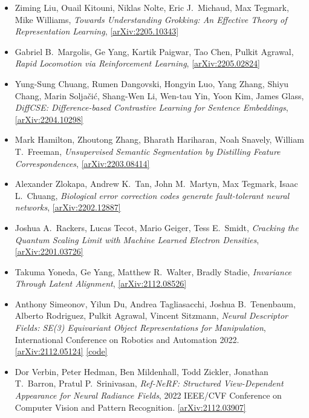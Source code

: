 \begin{itemize}
\item Ziming Liu, Ouail Kitouni, Niklas Nolte, Eric J.\  Michaud, Max Tegmark, Mike Williams, \textit{Towards Understanding Grokking: An Effective Theory of Representation Learning}, \href{https://arxiv.org/abs/2205.10343}{[arXiv:2205.10343]} 
\item Gabriel B.\  Margolis, Ge Yang, Kartik Paigwar, Tao Chen, Pulkit Agrawal, \textit{Rapid Locomotion via Reinforcement Learning}, \href{https://arxiv.org/abs/2205.02824}{[arXiv:2205.02824]} 
\item Yung-Sung Chuang, Rumen Dangovski, Hongyin Luo, Yang Zhang, Shiyu Chang, Marin Soljačić, Shang-Wen Li, Wen-tau Yin, Yoon Kim, James Glass, \textit{DiffCSE: Difference-based Contrastive Learning for Sentence Embeddings}, \href{https://arxiv.org/abs/2204.10298}{[arXiv:2204.10298]} 
\item Mark Hamilton, Zhoutong Zhang, Bharath Hariharan, Noah Snavely, William T.\  Freeman, \textit{Unsupervised Semantic Segmentation by Distilling Feature Correspondences}, \href{https://arxiv.org/abs/2203.08414}{[arXiv:2203.08414]} 
\item Alexander Zlokapa, Andrew K.\  Tan, John M.\  Martyn, Max Tegmark, Isaac L.\  Chuang, \textit{Biological error correction codes generate fault-tolerant neural networks}, \href{https://arxiv.org/abs/2202.12887}{[arXiv:2202.12887]} 
\item Joshua A.\  Rackers, Lucas Tecot, Mario Geiger, Tess E.\  Smidt, \textit{Cracking the Quantum Scaling Limit with Machine Learned Electron Densities}, \href{https://arxiv.org/abs/2201.03726}{[arXiv:2201.03726]} 
\item Takuma Yoneda, Ge Yang, Matthew R.\  Walter, Bradly Stadie, \textit{Invariance Through Latent Alignment}, \href{https://arxiv.org/abs/2112.08526}{[arXiv:2112.08526]} 
\item Anthony Simeonov, Yilun Du, Andrea Tagliasacchi, Joshua B.\  Tenenbaum, Alberto Rodriguez, Pulkit Agrawal, Vincent Sitzmann, \textit{Neural Descriptor Fields: SE(3) Equivariant Object Representations for Manipulation}, International Conference on Robotics and Automation 2022. \href{https://arxiv.org/abs/2112.05124}{[arXiv:2112.05124]}  \href{https://yilundu.github.io/ndf/}{[code]} 
\item Dor Verbin, Peter Hedman, Ben Mildenhall, Todd Zickler, Jonathan T.\  Barron, Pratul P.\  Srinivasan, \textit{Ref-NeRF: Structured View-Dependent Appearance for Neural Radiance Fields}, 2022 IEEE/CVF Conference on Computer Vision and Pattern Recognition. \href{https://arxiv.org/abs/2112.03907}{[arXiv:2112.03907]} 

\end{itemize}
